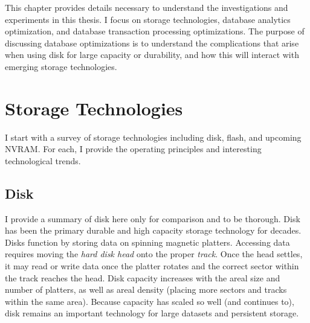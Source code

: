 This chapter provides details necessary to understand the investigations and experiments in this thesis.
I focus on storage technologies, database analytics optimization, and database transaction processing optimizations.
The purpose of discussing database optimizations is to understand the complications that arise when using disk for large capacity or durability, and how this will interact with emerging storage technologies.

\section{Storage Technologies}
\label{sec:Background:Storage}

I start with a survey of storage technologies including disk, flash, and upcoming NVRAM.
For each, I provide the operating principles and interesting technological trends.


%

\subsection{Disk}
\label{sec:Background:Storage:Disk}
I provide a summary of disk here only for comparison and to be thorough.
Disk has been the primary durable and high capacity storage technology for decades.
Disks function by storing data on spinning magnetic platters.
Accessing data requires moving the \emph{hard disk head} onto the proper \emph{track}.
Once the head settles, it may read or write data once the platter rotates and the correct sector within the track reaches the head.
Disk capacity increases with the areal size and number of platters, as well as areal density (placing more sectors and tracks within the same area).
Because capacity has scaled so well (and continues to), disk remains an important technology for large datasets and persistent storage.

